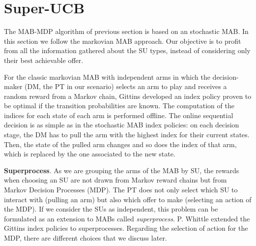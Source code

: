 
\section{Super-UCB}\label{sec:Super}
The MAB-MDP algorithm of previous section is based on an stochastic MAB. In this section we follow the markovian MAB approach. Our objective is to profit from all the information gathered about the SU types, instead of considering only their best achievable offer.

For the classic markovian MAB with independent arms in which the decision-maker (DM, the PT in our scenario) selects an arm to play and receives a random reward from a Markov chain, Gittins \cite{ref:Gittins2011} developed an index policy proven to be optimal if the transition probabilities are known.
The computation of the indices for each state of each arm is performed offline. 
The online sequential decision is as simple as in the stochastic MAB index policies: on each decision stage, the DM has to pull the arm with the highest index for their current states. 
Then, the state of the pulled arm changes and so does the index of that arm, which is replaced by the one associated to the new state. 

\textbf{Superprocess}. 
As we are grouping the arms of the MAB by SU, the rewards when choosing an SU are not drawn from Markov reward chains but from Markov Decision Processes (MDP). The PT does not only select which SU to interact with (pulling an arm) but also which offer to make (selecting an action of the MDP). 
If we consider the SUs as independent, this problem can be formulated as an extension to MABs called \textit{superprocess}. P. Whittle \cite{ref:Whittle1980} extended the Gittins index policies to superprocesses. Regarding the selection of action for the MDP, there are different choices that we discuss later.


